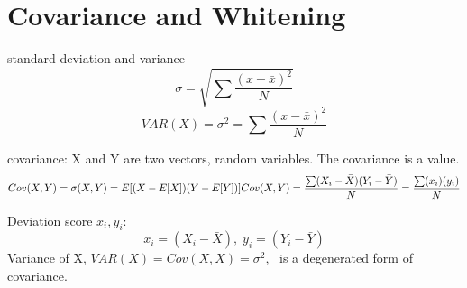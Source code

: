 \section{Covariance and Whitening}
\begin{compactitem}

\item {standard deviation and variance}
\begin{equation}
\label{eq:std}
\sigma = \sqrt {\sum \frac{(x-\bar{x})^2}{N}}
\end{equation}
\begin{equation}
\label{eq:variance}
VAR(X)=\sigma^{2} = {\sum \frac{(x-\bar{x})^2}{N}}
\end{equation}

\item covariance: X and Y are two vectors, random variables. The covariance is a value.
\begin{equation}
\label{eq:covar}
Cov(X,Y)=\sigma(X,Y)=E[(X - E[X])(Y-E[Y])] \\
Cov(X,Y)=\frac{\sum(X_i-\bar{X})(Y_i-\bar{Y})}{N}=
\frac{\sum(x_i)(y_i)}{N}
\end{equation}

Deviation score $x_i, y_i$:
\begin{equation}
\label{eq:covar1}
x_{i}=(X_i-\bar{X}),\;
y_{i}=(Y_i-\bar{Y})
\end{equation}
Variance of X, $VAR(X)=Cov(X,X)=\sigma^{2}$, \ is a degenerated form of covariance.\\


\end{compactitem}
